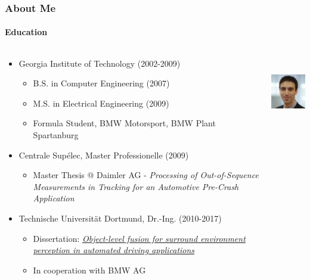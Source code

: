\begin{frame}[t]
\frametitle{About Me}
\framesubtitle{Education}
\begin{columns}[T]
    \begin{column}{.75\textwidth}
    \begin{itemize}
        \item Georgia Institute of Technology (2002-2009)
        \begin{itemize}
            \item B.S. in Computer Engineering (2007)
            \item M.S. in Electrical Engineering (2009)
            \item Formula Student, BMW Motorsport, BMW Plant Spartanburg
        \end{itemize}
        \item Centrale Sup\'{e}lec, Master Professionelle (2009)
        \begin{itemize}
            \item Master Thesis @ Daimler AG - \emph{Processing of Out-of-Sequence
                Measurements in Tracking for an Automotive Pre-Crash Application}
        \end{itemize}
        \item Technische Universit\"{a}t Dortmund, Dr.-Ing. (2010-2017)
        \begin{itemize}
            \item Dissertation: \emph{\href{https://eldorado.tu-dortmund.de/handle/2003/36011}{Object-level fusion for surround environment perception in automated driving applications}}
            \item In cooperation with BMW AG
        \end{itemize}
    \end{itemize}
    \end{column}
    \begin{column}{.25\textwidth}
    \centering
    \includegraphics[height=3cm]{images/michael-aeberhard-profile.jpg} \\
    \end{column}
\end{columns}
\end{frame}

